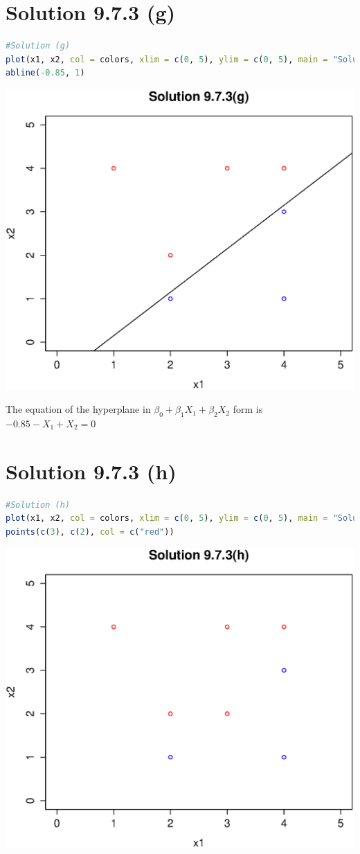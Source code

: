 \documentclass[a4paper,10pt]{article}
\begin{document}
\section{Solution 9.7.3 (g)}
\begin{lstlisting}[language=R]
#Solution (g)
plot(x1, x2, col = colors, xlim = c(0, 5), ylim = c(0, 5), main = "Solution 9.7.3(g)")
abline(-0.85, 1)
\end{lstlisting}
\begin{center}
\includegraphics[scale=0.70]{not_optimal}
\end{center}
The equation of the hyperplane in $\beta_0 + \beta_1X_1 + \beta_2X_2$ form \newline is $-0.85-X_1+X_2=0$

\section{Solution 9.7.3 (h)}
\begin{lstlisting}[language=R]
#Solution (h)
plot(x1, x2, col = colors, xlim = c(0, 5), ylim = c(0, 5), main = "Solution 9.7.3(h)")
points(c(3), c(2), col = c("red"))
\end{lstlisting}
\begin{center}
\includegraphics[scale=0.70]{additional_obs}
\end{center}
\end{document}
